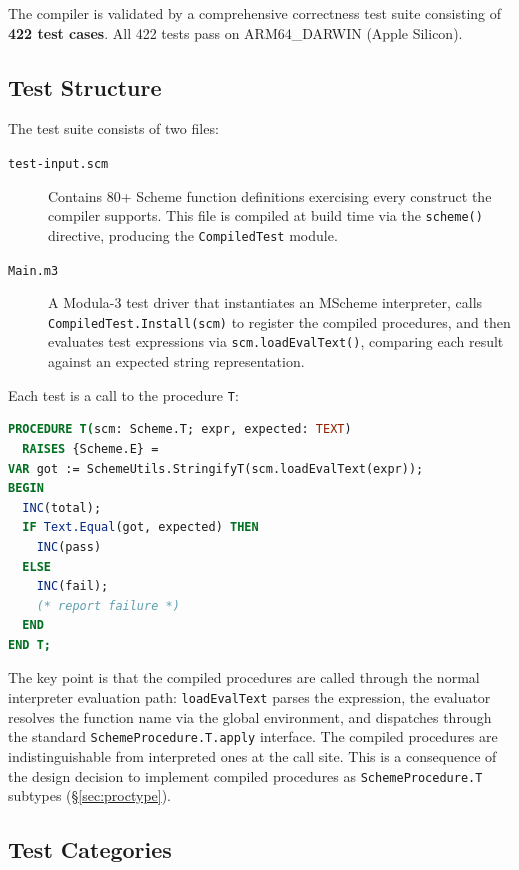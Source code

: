 \documentclass[12pt]{report}
\begin{document}
The compiler is validated by a comprehensive correctness test suite
consisting of \textbf{422 test cases}.
All 422 tests pass on ARM64\_DARWIN (Apple Silicon).

\subsection{Test Structure}

The test suite consists of two files:

\begin{description}
\item[\texttt{test-input.scm}] Contains 80+ Scheme function
  definitions exercising every construct the compiler supports.
  This file is compiled at build time via the \texttt{scheme()}
  directive, producing the \texttt{CompiledTest} module.

\item[\texttt{Main.m3}] A Modula-3 test driver that instantiates an
  MScheme interpreter, calls \texttt{CompiledTest.Install(scm)} to
  register the compiled procedures, and then evaluates test
  expressions via \texttt{scm.loadEvalText()}, comparing each result
  against an expected string representation.
\end{description}

Each test is a call to the procedure \texttt{T}:

\begin{lstlisting}[language=Modula3]
PROCEDURE T(scm: Scheme.T; expr, expected: TEXT)
  RAISES {Scheme.E} =
VAR got := SchemeUtils.StringifyT(scm.loadEvalText(expr));
BEGIN
  INC(total);
  IF Text.Equal(got, expected) THEN
    INC(pass)
  ELSE
    INC(fail);
    (* report failure *)
  END
END T;
\end{lstlisting}

The key point is that the compiled procedures are called through
the normal interpreter evaluation path: \texttt{loadEvalText}
parses the expression, the evaluator resolves the function name
via the global environment, and dispatches through the standard
\texttt{SchemeProcedure.T.apply} interface.  The compiled procedures
are indistinguishable from interpreted ones at the call site.  This is
a consequence of the design decision to implement compiled procedures
as \texttt{SchemeProcedure.T} subtypes (\S\ref{sec:proctype}).

\subsection{Test Categories}
\end{document}
